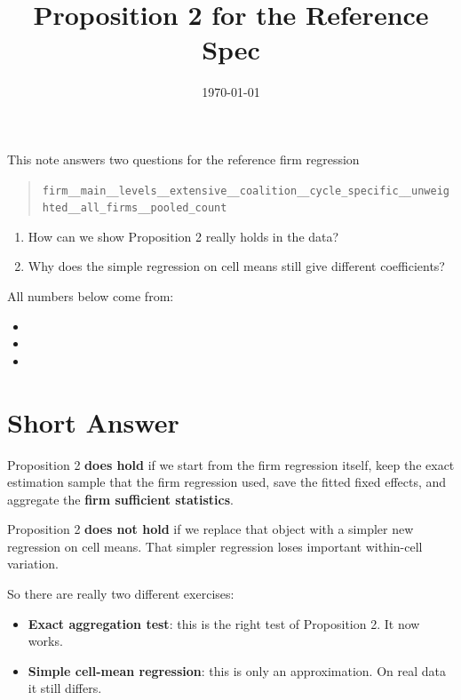 \documentclass[11pt]{article}
\title{Proposition 2 for the Reference Spec}
\author{}
\date{\today}
\begin{document}
\maketitle

This note answers two questions for the reference firm regression
\begin{quote}
\texttt{firm\_\_main\_\_levels\_\_extensive\_\_coalition\_\_cycle\_specific\_\_unweighted\_\_all\_firms\_\_pooled\_count}
\end{quote}

\begin{enumerate}
  \item How can we show Proposition 2 really holds in the data?
  \item Why does the simple regression on cell means still give different coefficients?
\end{enumerate}

All numbers below come from:
\begin{itemize}
  \item {}
  \item {}
  \item {}
\end{itemize}

\section*{Short Answer}

Proposition 2 \textbf{does hold} if we start from the firm regression itself, keep the exact estimation sample that the firm regression used, save the fitted fixed effects, and aggregate the \textbf{firm sufficient statistics}.

Proposition 2 \textbf{does not hold} if we replace that object with a simpler new regression on cell means. That simpler regression loses important within-cell variation.

So there are really two different exercises:
\begin{itemize}
  \item \textbf{Exact aggregation test}: this is the right test of Proposition 2. It now works.
  \item \textbf{Simple cell-mean regression}: this is only an approximation. On real data it still differs.
\end{itemize}
\end{document}
